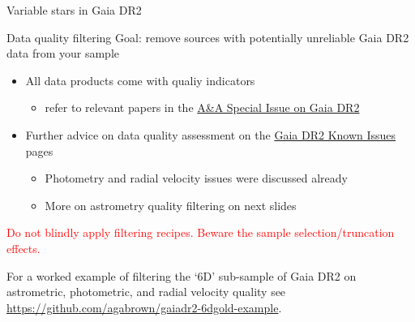 \documentclass[smaller, aspectratio=169]{beamer}
\begin{document}
\begin{agaframe}[1-2]{Variable stars in Gaia DR2}
{
  }
\end{agaframe}
%
%
\begin{agaframe}{Data quality filtering}
  Goal: remove sources with potentially unreliable Gaia DR2 data from your sample
  \begin{itemize}
    \item All data products come with qualiy indicators
      \begin{itemize}
        \item refer to relevant papers in the
          \href{https://www.aanda.org/component/toc/?task=topic&id=922}{A\&A Special Issue on Gaia
          DR2}
      \end{itemize}
    \item Further advice on data quality assessment on the
      \href{https://www.cosmos.esa.int/web/gaia/dr2-known-issues}{Gaia DR2 Known Issues} pages
      \begin{itemize}
        \item Photometry and radial velocity issues were discussed already
        \item More on astrometry quality filtering on next slides
      \end{itemize}
  \end{itemize}

  \bigskip
  \begin{center}
    \textcolor{red}{Do not blindly apply filtering recipes. Beware the sample selection/truncation
    effects.}
  \end{center}

  \bigskip
  For a worked example of filtering the `6D' sub-sample of Gaia DR2 on astrometric, photometric, and
  radial velocity quality see \url{https://github.com/agabrown/gaiadr2-6dgold-example}.
\end{agaframe}
\end{document}
